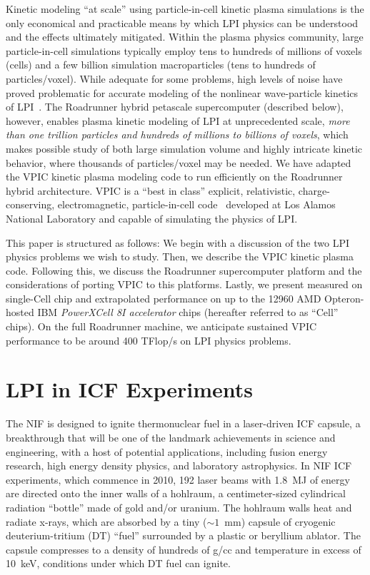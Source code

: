 \documentclass[10pt]{article}
\begin{document}
Kinetic modeling ``at scale'' using particle-in-cell kinetic plasma
simulations is the only economical and practicable means by which LPI
physics can be understood and the effects ultimately mitigated.
Within the plasma physics community, large particle-in-cell
simulations typically employ tens to hundreds of millions of voxels
(cells) and a few billion simulation macroparticles (tens to hundreds
of particles/voxel).  While adequate for some problems, high levels of
noise have proved problematic for accurate modeling of the nonlinear
wave-particle kinetics of LPI~\cite{Yin_et_al_Phys_Plasmas_2006}.  The
Roadrunner hybrid petascale supercomputer (described below), however,
enables plasma kinetic modeling of LPI at unprecedented scale,
\textit{more than one trillion particles and hundreds of millions to
billions of voxels}, which makes possible study of both large
simulation volume and highly intricate kinetic behavior, where
thousands of particles/voxel may be needed.  We have adapted the VPIC
kinetic plasma modeling code to run efficiently on the Roadrunner
hybrid architecture.  VPIC is a ``best in class'' explicit,
relativistic, charge-conserving, electromagnetic, particle-in-cell
code~\cite{Bowers_et_al_Phys_Plasmas_2007} developed at Los Alamos
National Laboratory and capable of simulating the physics of LPI.

This paper is structured as follows: We begin with a discussion of the
two LPI physics problems we wish to study.  Then, we describe the VPIC
kinetic plasma code.  Following this, we discuss the Roadrunner
supercomputer platform and the considerations of porting VPIC to this
platforms.  Lastly, we present measured on single-Cell chip and
extrapolated performance on up to the 12960 AMD Opteron-hosted IBM
\emph{PowerXCell 8I accelerator} chips (hereafter referred to as
``Cell'' chips).  On the full Roadrunner machine, we anticipate
sustained VPIC performance to be around 400 TFlop/s on LPI physics
problems.

\section{LPI in ICF Experiments}

The NIF is designed to ignite thermonuclear fuel in a laser-driven ICF
capsule, a breakthrough that will be one of the landmark achievements
in science and engineering, with a host of potential applications,
including fusion energy research, high energy density physics, and
laboratory astrophysics.  In NIF ICF experiments, which commence in
2010, 192 laser beams with 1.8~MJ of energy are directed onto the
inner walls of a hohlraum, a centimeter-sized cylindrical radiation
``bottle'' made of gold and/or uranium.  The hohlraum walls heat and
radiate x-rays, which are absorbed by a tiny ($\sim 1$~mm) capsule of
cryogenic deuterium-tritium (DT) ``fuel'' surrounded by a plastic or
beryllium ablator.  The capsule compresses to a density of hundreds of
g/cc and temperature in excess of 10~keV, conditions under which DT
fuel can ignite.
\end{document}
